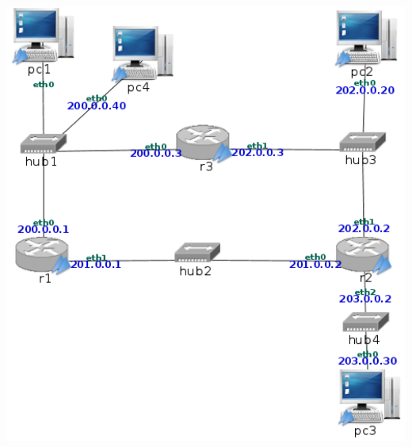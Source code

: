 \documentclass[12pt, a4paper]{report}
\begin{document}
\includegraphics*[scale=0.15, center]{enunciado2}
\end{document}
